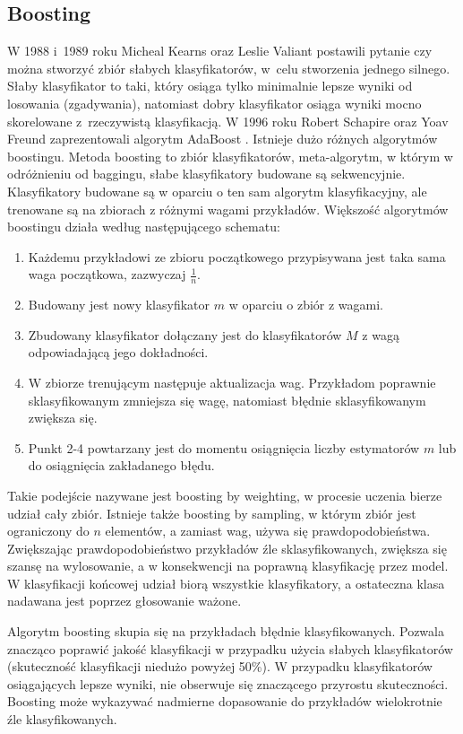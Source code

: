 \subsection{Boosting}
W 1988 i 1989 roku Micheal Kearns oraz Leslie Valiant postawili pytanie czy można stworzyć zbiór słabych klasyfikatorów, w celu stworzenia jednego silnego. Słaby klasyfikator to taki, który osiąga tylko minimalnie lepsze wyniki od losowania (zgadywania), natomiast dobry klasyfikator osiąga wyniki mocno skorelowane z rzeczywistą klasyfikacją. W 1996 roku Robert Schapire oraz Yoav Freund zaprezentowali algorytm AdaBoost \cite{adaboostc}. Istnieje dużo różnych algorytmów boostingu. 
Metoda boosting \cite{boostingc} to zbiór klasyfikatorów, meta-algorytm, w którym w odróżnieniu od baggingu, słabe klasyfikatory budowane są sekwencyjnie. Klasyfikatory budowane są w oparciu o ten sam algorytm klasyfikacyjny, ale trenowane są na zbiorach z różnymi wagami przykładów. Większość algorytmów boostingu działa według następującego schematu:
\begin{enumerate}
	\item Każdemu przykładowi ze zbioru początkowego przypisywana jest taka sama waga początkowa, zazwyczaj $\frac{1}{n}$.
	\item Budowany jest nowy klasyfikator $m$ w oparciu o zbiór z wagami.
	\item Zbudowany klasyfikator dołączany jest do klasyfikatorów $M$ z wagą odpowiadającą jego dokładności.
	\item W zbiorze trenującym następuje aktualizacja wag. Przykładom poprawnie sklasyfikowanym zmniejsza się wagę, natomiast błędnie sklasyfikowanym zwiększa się.
	\item Punkt 2-4 powtarzany jest do momentu osiągnięcia liczby estymatorów $m$ lub do osiągnięcia zakładanego błędu. 
\end{enumerate}
Takie podejście nazywane jest boosting by weighting, w procesie uczenia bierze udział cały zbiór. Istnieje także boosting by sampling, w którym zbiór jest ograniczony do $n$ elementów, a zamiast wag, używa się prawdopodobieństwa. Zwiększając prawdopodobieństwo przykładów źle sklasyfikowanych, zwiększa się szansę na wylosowanie, a w konsekwencji na poprawną klasyfikację przez model. W klasyfikacji końcowej udział biorą wszystkie klasyfikatory, a ostateczna klasa nadawana jest poprzez głosowanie ważone.\par
Algorytm boosting skupia się na przykładach błędnie klasyfikowanych. Pozwala znacząco poprawić jakość klasyfikacji w przypadku użycia słabych klasyfikatorów (skuteczność klasyfikacji niedużo powyżej 50\%). W przypadku klasyfikatorów osiągających lepsze wyniki, nie obserwuje się znaczącego przyrostu skuteczności. Boosting może wykazywać nadmierne dopasowanie do przykładów wielokrotnie źle klasyfikowanych. \par
